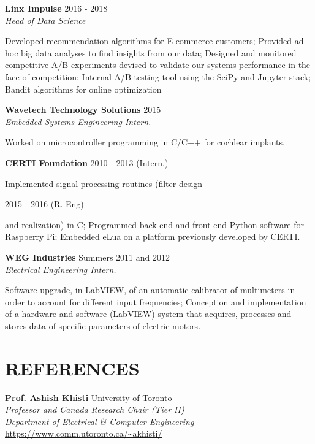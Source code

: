 \documentclass[margin, line]{res}
\begin{document}
\begin{resume}
\textbf{Linx Impulse} \hfill 2016 - 2018\\
{\sl Head of Data Science}\\
\begin{small}
    Developed recommendation algorithms for E-commerce customers; Provided ad-hoc big data analyses to find insights from our data; Designed and monitored competitive A/B experiments devised to validate our systems performance in the face of competition; Internal A/B testing tool using the SciPy and Jupyter stack; Bandit algorithms for online optimization
\end{small}

\textbf{Wavetech Technology Solutions} \hfill 2015\\
{\sl Embedded Systems Engineering Intern.}\\
\begin{small}
    Worked on microcontroller programming in C/C++ for cochlear implants.
\end{small}

\textbf{CERTI Foundation} \hfill 2010 - 2013 (Intern.)\\
\begin{small}
    Implemented signal processing routines (filter design 
\end{small}
\hfill 2015 - 2016 (R. Eng)\\ 
\begin{small}
    and realization) in C; Programmed back-end and front-end Python software for Raspberry Pi; Embedded eLua on a platform previously developed by CERTI.
\end{small}

\textbf{WEG Industries}  \hfill Summers 2011 and 2012\\
{\sl Electrical Engineering Intern.}\\
\begin{small}
    Software upgrade, in LabVIEW, of an automatic calibrator of multimeters in order to account for different input frequencies; Conception and implementation of a hardware and software (LabVIEW) system that acquires, processes and stores data of specific parameters of electric motors.
\end{small}

\section{REFERENCES}
\textbf{Prof. Ashish Khisti} \hfill University of Toronto\\
{\sl Professor and Canada Research Chair (Tier II)}\\
{\sl Department of Electrical \& Computer Engineering}\\
\url{https://www.comm.utoronto.ca/~akhisti/}


\end{resume}
\end{document}
